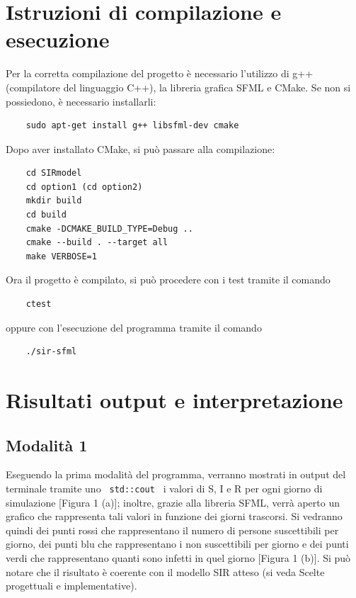 \documentclass[a4paper,10 pt]{article}
\begin{document}
\section{Istruzioni di compilazione e esecuzione}


Per la corretta compilazione del progetto è necessario l'utilizzo di g++ (compilatore del linguaggio C++), la libreria grafica SFML e CMake. 
Se non si possiedono, è necessario installarli:
\begin{lstlisting}
	sudo apt-get install g++ libsfml-dev cmake
\end{lstlisting}
Dopo aver installato CMake, si può passare alla compilazione:
\begin{lstlisting}
	cd SIRmodel
	cd option1 (cd option2)
	mkdir build
	cd build
	cmake -DCMAKE_BUILD_TYPE=Debug ..
	cmake --build . --target all
	make VERBOSE=1 
\end{lstlisting}
Ora il progetto è compilato, si può procedere con i test tramite il comando
\begin{lstlisting}
	ctest
\end{lstlisting}
oppure con l'esecuzione del programma tramite il comando
\begin{lstlisting}
	./sir-sfml
\end{lstlisting}
\section{Risultati output e interpretazione}
\subsection{Modalità 1}
Eseguendo la prima modalità del programma, verranno mostrati in output del terminale tramite uno  \verb! std::cout ! i valori di S, I e R per ogni giorno di simulazione [Figura 1 (a)]; inoltre, grazie alla libreria SFML, verrà aperto un grafico che rappresenta tali valori in funzione dei giorni trascorsi. Si vedranno quindi dei punti rossi che rappresentano il numero di persone suscettibili per giorno, dei punti blu che rappresentano i non suscettibili per giorno e dei punti verdi che rappresentano quanti sono infetti in quel giorno [Figura 1 (b)]. Si può notare che il risultato è coerente con il modello SIR atteso (si veda Scelte progettuali e implementative).
\end{document}
